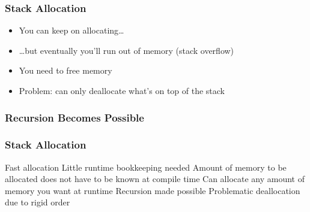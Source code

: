 \begin{frame}
  \frametitle{Stack Allocation}
  \begin{itemize}
    \item You can keep on allocating\dots
    \item \dots but eventually you'll run out of memory (stack overflow)
    \item You need to free memory
    \item Problem: can only deallocate what's on top of the stack
  \end{itemize}
\end{frame}

\begin{frame}
  \frametitle{Recursion Becomes Possible}
  \begin{center}
  \end{center}
\end{frame}


\begin{frame}
  \frametitle{Stack Allocation}
  \begin{procontralist}
    \pro Fast allocation
    \pro Little runtime bookkeeping needed
    \pro Amount of memory to be allocated does not have to be known at compile time
    \pro Can allocate any amount of memory you want at runtime
    \pro Recursion made possible
    \con Problematic deallocation due to rigid order
  \end{procontralist}
\end{frame}

